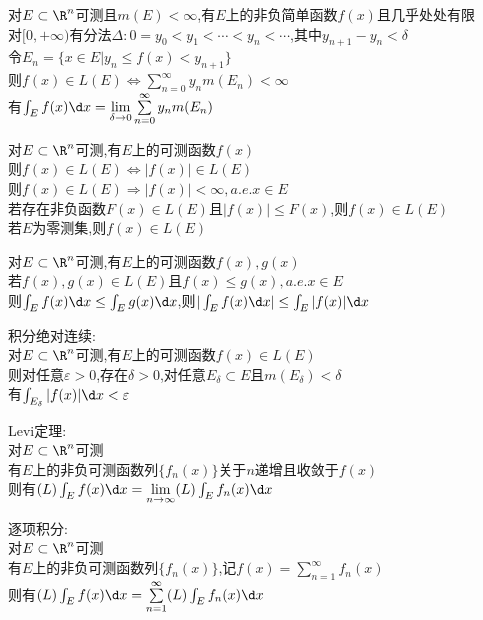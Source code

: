 \begin{dingli}
对$E\subset\R^n$可测且$m(E)<\infty$,有$E$上的非负简单函数$f(x)$且几乎处处有限\\
对$[0,+\infty)$有分法$\Delta:0=y_0<y_1<\cdots<y_n<\cdots$,其中$y_{n+1}-y_{n}<\delta$\\
令$E_n=\{x\in E|y_n\leq f(x)<y_{n+1}\}$\\
则$f(x)\in L(E)$$\Leftrightarrow$$\sum\limits_{n=0}^{\infty}y_nm(E_n)<\infty$\\
有$\int_{E}f(x)\d x=\lim\limits_{\delta\to 0}\sum\limits_{n=0}^{\infty}y_nm(E_n)$
\end{dingli}

\begin{dingli}
对$E\subset\R^n$可测,有$E$上的可测函数$f(x)$\\
则$f(x)\in L(E)$$\Leftrightarrow$$|f(x)|\in L(E)$\\
则$f(x)\in L(E)$$\Rightarrow$$|f(x)|<\infty,a.e.x\in E$\\
若存在非负函数$F(x)\in L(E)$且$|f(x)|\leq F(x)$,则$f(x)\in L(E)$\\
若$E$为零测集,则$f(x)\in L(E)$
\end{dingli}

\begin{dingli}
对$E\subset\R^n$可测,有$E$上的可测函数$f(x),g(x)$\\
若$f(x),g(x)\in L(E)$且$f(x)\leq g(x),a.e.x\in E$\\
则$\int_{E}f(x)\d x\leq \int_{E}g(x)\d x$,则$|\int_{E}f(x)\d x|\leq \int_E|f(x)|\d x$
\end{dingli}

\begin{dingli}
积分绝对连续:\\
对$E\subset\R^n$可测,有$E$上的可测函数$f(x)\in L(E)$\\
则对任意$\varepsilon>0$,存在$\delta>0$,对任意$E_{\delta}\subset E$且$m(E_{\delta})<\delta$\\
有$\int_{E_{\delta}}|f(x)|\d x<\varepsilon$
\end{dingli}

\begin{dingli}
Levi定理:\\
对$E\subset\R^n$可测\\
有$E$上的非负可测函数列$\{f_n(x)\}$关于$n$递增且收敛于$f(x)$\\
则有$(L)\int_{E}f(x)\d x=\lim\limits_{n\to\infty}(L)\int_{E}f_n(x)\d x$
\end{dingli}

\begin{tuilun}
逐项积分:\\
对$E\subset\R^n$可测\\
有$E$上的非负可测函数列$\{f_n(x)\}$,记$f(x)=\sum\limits_{n=1}^{\infty}f_n(x)$\\
则有$(L)\int_{E}f(x)\d x=\sum\limits_{n=1}^{\infty}(L)\int_{E}f_n(x)\d x$
\end{tuilun}


